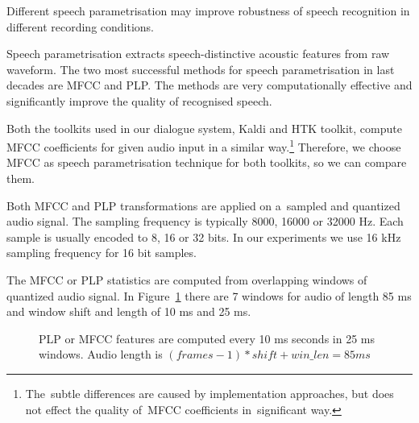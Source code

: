 Different speech parametrisation may improve robustness of speech recognition in different recording conditions.

Speech parametrisation extracts speech-distinctive acoustic features from raw waveform.
The two most successful methods for speech parametrisation in last decades are \ac{MFCC}\cite{davis1980comparison} and \ac{PLP}\cite{hermansky1990perceptual}.
The methods are very computationally effective and significantly improve the quality of recognised speech.


Both the toolkits used in our dialogue system, Kaldi and \ac{HTK} toolkit, compute \ac{MFCC} coefficients for given audio input in a similar way.\footnote{The~subtle differences are caused by implementation approaches, but does not effect the quality of~\ac{MFCC} coefficients in~significant way.}
Therefore, we choose \ac{MFCC} as speech parametrisation technique for both toolkits, so we can compare them.

Both \ac{MFCC} and \ac{PLP} transformations are applied on a~sampled and quantized audio signal.
The sampling frequency is typically 8000, 16000 or 32000 Hz.
Each sample is usually encoded to 8, 16 or 32 bits. 
In our experiments we use 16 kHz sampling frequency for 16 bit samples.  

The \ac{MFCC} or \ac{PLP} statistics are computed from overlapping windows of quantized audio signal.
In Figure~\ref{fig:mfcc_window} there are 7 windows for audio of length 85 ms and window shift and length of 10 ms and 25 ms.

\begin{figure}[!htp]
    \begin{center}
    
    \caption{\ac{PLP} or \ac{MFCC} features are computed every 10 ms seconds in 25 ms windows.
    Audio length is $(frames-1)*shift + win\_len = 85ms$}
    \label{fig:mfcc_window} 
    \end{center}
\end{figure}

